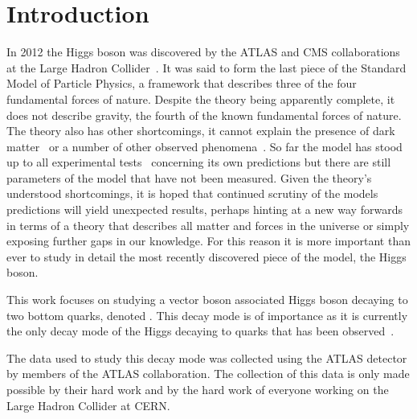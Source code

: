 \chapter{Introduction}%
\label{ch:intro}

In 2012 the Higgs boson was discovered by the ATLAS and CMS collaborations at
the Large Hadron Collider~\cite{DiscoHiggsATLAS, DiscoHiggsCMS}. It was said to
form the last piece of the Standard Model of Particle Physics, a framework that
describes three of the four fundamental forces of nature. Despite the theory
being apparently complete, it does not describe gravity, the fourth of the known
fundamental forces of nature. The theory also has other shortcomings, it cannot
explain the presence of dark matter~\cite{DM-ev-sloan, DM-ev-nucleosynth,
  DM-ev-supernova, DM-ev-scaffold, DM-ev-direct, DM-ev-strong-lens,
  DM-ev-candidates, DM-ev-PDG, DM-ev-Zwicky, DM-ev-nonbaryonic, DM-ev-particle}
or a number of other observed phenomena~\cite{anom-BD-branching,
  anom-Dtau-excess, anom-g-2, anom-proton-radius, anom-bsll-trans}. So far the
model has stood up to all experimental tests~\cite{EWtests, 1998-SMtests}
concerning its own predictions but there are still parameters of the model that
have not been measured. Given the theory's understood shortcomings, it is hoped
that continued scrutiny of the models predictions will yield unexpected results,
perhaps hinting at a new way forwards in terms of a theory that describes all
matter and forces in the universe or simply exposing further gaps in our
knowledge. For this reason it is more important than ever to study in detail the
most recently discovered piece of the model, the Higgs boson.

This work focuses on studying a vector boson associated Higgs boson decaying to
two bottom quarks, denoted \VHbb. This decay mode is of importance as it is
currently the only decay mode of the Higgs decaying to quarks that has been
observed~\cite{vhbb-obs}.

The data used to study this decay mode was collected using the ATLAS detector by
members of the ATLAS collaboration. The collection of this data is only made
possible by their hard work and by the hard work of everyone working on the
Large Hadron Collider at CERN.

